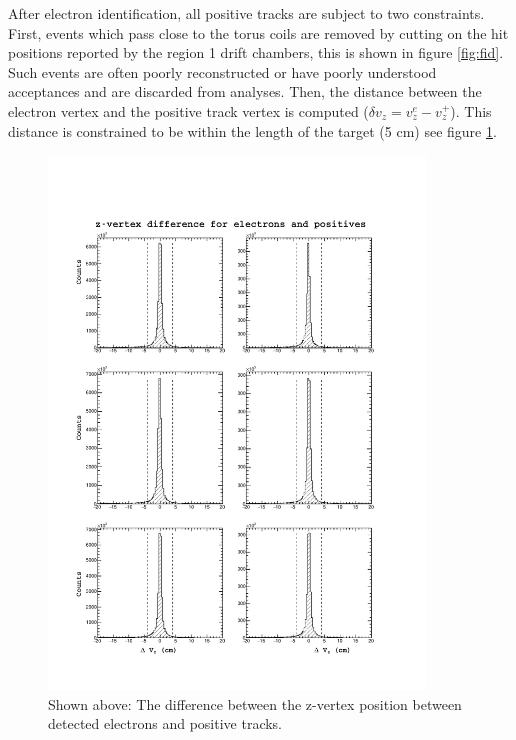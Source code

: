 After electron identification, all positive tracks are subject to two constraints.  First, events which pass close to the torus coils are removed by cutting on the hit positions reported by the region 1 drift chambers, this is shown in figure \ref{fig:fid}.  Such events are often poorly reconstructed or have poorly understood acceptances and are discarded from analyses.  Then, the distance between the electron vertex and the positive track vertex is computed ($\delta v_{z} = v_{z}^{e} - v_{z}^{+}$).  This distance is constrained to be within the length of the target (5 cm) see figure \ref{fig:dvz}.  

\begin{figure}
  \label{fig:dvz}
  \begin{center}
    \includegraphics[width=10cm]{image/dvz.pdf}
    \caption{Shown above: The difference between the z-vertex position between detected electrons and positive tracks.}
  \end{center}
\end{figure}

